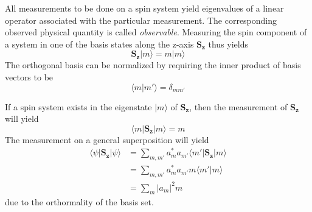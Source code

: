 \documentclass[11.5pt,a4paper]{article}
\begin{document}
All measurements to be done on a spin system yield eigenvalues of a linear operator associated with the particular measurement. The corresponding observed physical quantity is called \emph{observable}. Measuring the spin component of a system in one of the basis states along the z-axis $\mathbf{S_z}$ thus yields
\begin{equation}
  \mathbf{S_z} |m\rangle = m |m\rangle
\end{equation}
The orthogonal basis can be normalized by requiring the inner product of basis vectors to be
\begin{equation}
 \langle m|m'\rangle = \delta_{m m'}
  \label{eq-orthonormality}
\end{equation}

If a spin system exists in the eigenstate $|m\rangle$ of $\mathbf{S_z}$, then the measurement of $\mathbf{S_z}$ will yield
\begin{equation}
 \langle m | \mathbf{S_z} | m \rangle = m
\end{equation}
The measurement on a general superposition will yield
\begin{align}
 \langle \psi | \mathbf{S_z} | \psi \rangle & = \sum_{m,m'} a_m^* a_{m'} \langle m' | \mathbf{S_z} | m \rangle\\
  & = \sum_{m,m'} a_m^* a_{m'} m \langle m' | m \rangle\\
  & = \sum_{m} |a_{m}|^2  m
\end{align}
due to the orthormality of the basis set.
\end{document}
